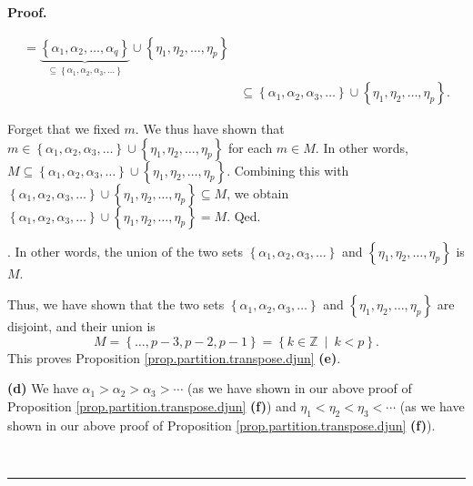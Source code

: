 \documentclass[numbers=enddot,12pt,final,onecolumn,notitlepage]{scrartcl}%
\theoremstyle{definition}
\newenvironment{proof}[1][Proof]{\noindent\textbf{#1.} }{\ \rule{0.5em}{0.5em}}
\newenvironment{verlong}{}{}
\begin{document}
\begin{verlong}
\begin{proof}
{\begin{align*}
=\underbrace{\left\{  \alpha_{1},\alpha_{2},\ldots,\alpha_{q}\right\}
}_{\subseteq\left\{  \alpha_{1},\alpha_{2},\alpha_{3},\ldots\right\}  }%
\cup\left\{  \eta_{1},\eta_{2},\ldots,\eta_{p}\right\} \\
&  \subseteq\left\{  \alpha_{1},\alpha_{2},\alpha_{3},\ldots\right\}
\cup\left\{  \eta_{1},\eta_{2},\ldots,\eta_{p}\right\}  .
\end{align*}
\par
Forget that we fixed $m$. We thus have shown that $m\in\left\{  \alpha
_{1},\alpha_{2},\alpha_{3},\ldots\right\}  \cup\left\{  \eta_{1},\eta
_{2},\ldots,\eta_{p}\right\}  $ for each $m\in M$. In other words,
$M\subseteq\left\{  \alpha_{1},\alpha_{2},\alpha_{3},\ldots\right\}
\cup\left\{  \eta_{1},\eta_{2},\ldots,\eta_{p}\right\}  $. Combining this with
$\left\{  \alpha_{1},\alpha_{2},\alpha_{3},\ldots\right\}  \cup\left\{
\eta_{1},\eta_{2},\ldots,\eta_{p}\right\}  \subseteq M$, we obtain $\left\{
\alpha_{1},\alpha_{2},\alpha_{3},\ldots\right\}  \cup\left\{  \eta_{1}%
,\eta_{2},\ldots,\eta_{p}\right\}  =M$. Qed.}. In other words, the union of
the two sets $\left\{  \alpha_{1},\alpha_{2},\alpha_{3},\ldots\right\}  $ and
$\left\{  \eta_{1},\eta_{2},\ldots,\eta_{p}\right\}  $ is $M$.

Thus, we have shown that the two sets $\left\{  \alpha_{1},\alpha_{2}%
,\alpha_{3},\ldots\right\}  $ and $\left\{  \eta_{1},\eta_{2},\ldots,\eta
_{p}\right\}  $ are disjoint, and their union is
\[
M=\left\{  \ldots,p-3,p-2,p-1\right\}  =\left\{  k\in\mathbb{Z}\ \mid
\ k<p\right\}  .
\]
This proves Proposition \ref{prop.partition.transpose.djun} \textbf{(e)}.

\textbf{(d)} We have $\alpha_{1}>\alpha_{2}>\alpha_{3}>\cdots$ (as we have
shown in our above proof of Proposition \ref{prop.partition.transpose.djun}
\textbf{(f)}) and $\eta_{1}<\eta_{2}<\eta_{3}<\cdots$ (as we have shown in our
above proof of Proposition \ref{prop.partition.transpose.djun} \textbf{(f)}).


\end{proof}
\end{verlong}
\end{document}
